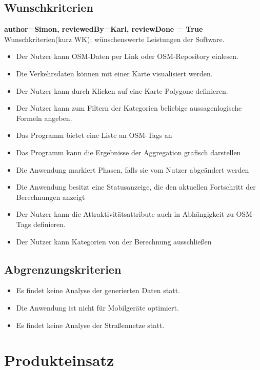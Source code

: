 \documentclass[parskip=full]{scrartcl} %
\begin{document}
\subsection{Wunschkriterien}
\textbf{author=Simon, reviewedBy=Karl, reviewDone = True\\}
Wunschkriterien(kurz WK): wünschenswerte Leistungen der Software.
\begin{itemize}
    \item <WK1> Der Nutzer kann OSM-Daten per Link oder OSM-Repository einlesen.
    \item <WK2> Die Verkehrsdaten können mit einer Karte visualisiert werden.
    \item <WK3> Der Nutzer kann durch Klicken auf eine Karte Polygone definieren.
    \item <WK4> Der Nutzer kann zum Filtern der Kategorien beliebige aussagenlogische Formeln angeben.
    \item <WK5> Das Programm bietet eine Liste an OSM-Tags an
    \item <WK6> Das Programm kann die Ergebnisse der Aggregation grafisch darstellen
    \item <WK7> Die Anwendung markiert Phasen, falls sie vom Nutzer abgeändert werden
    \item <WK8> Die Anwendung besitzt eine Statusanzeige, die den aktuellen Fortschritt der Berechnungen anzeigt
    \item <WK9> Der Nutzer kann die Attraktivitätsattribute auch in Abhängigkeit zu OSM-Tags definieren.
    \item <WK10> Der Nutzer kann Kategorien von der Berechnung ausschließen
    
\end{itemize}

\subsection{Abgrenzungskriterien}
\begin{itemize}
    \item Es findet keine Analyse der generierten Daten statt.
    \item Die Anwendung ist nicht für Mobilgeräte optimiert.
    \item Es findet keine Analyse der Straßennetze statt.
\end{itemize}
\newpage

\section{Produkteinsatz}
\end{document}
